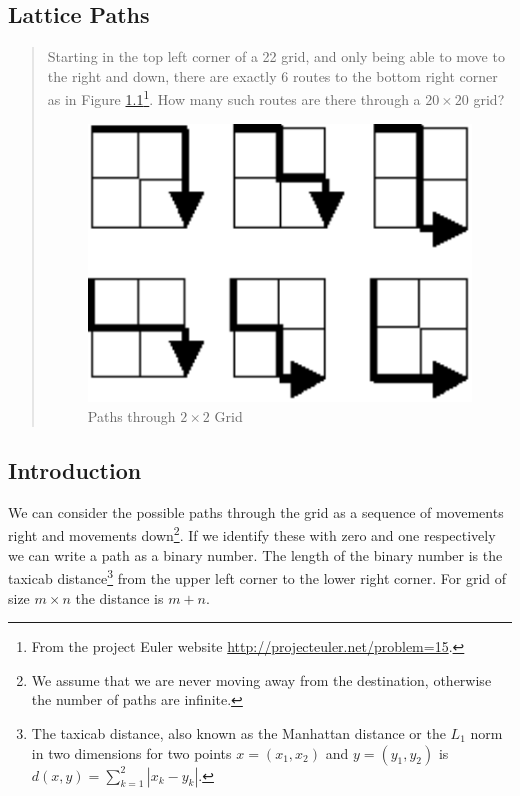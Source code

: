 \documentclass[oneside,12pt]{book}   	%
\newcounter{ex}
\newcounter{pr}
\theoremstyle{definition}
\newcommand{\order}[1]{\left| #1 \right|}
\begin{document}
\begin{spacing}{1.618}
	\chapter{Lattice Paths}
		\begin{quote}
			Starting in the top left corner of a 22 grid, and only being able to move to the right and down, there are exactly 6 routes to the bottom right corner as in Figure \ref{Fig:15:1}\footnote{From the project Euler website \url{http://projecteuler.net/problem=15}.}. How many such routes are there through a $20\times 20$ grid?
			\begin{figure}
				\centering
					\includegraphics[]{p_015.pdf}
				\caption{Paths through $2\times 2$ Grid}\label{Fig:15:1}
			\end{figure}
		\end{quote}
		\section{Introduction}
		
			We can consider the possible paths through the grid as a sequence of movements right and movements down\footnote{We assume that we are never moving away from the destination, otherwise the number of paths are infinite.}. If we identify these with zero and one respectively we can write a path as a binary number. The length of the binary number is the taxicab distance\footnote{The taxicab distance, also known as the Manhattan distance or the $L_1$ norm in two dimensions for two points $x=(x_1, x_2)$ and $y=(y_1, y_2)$ is $d(x, y)=\sum_{k=1}^2\order{x_k-y_k}$.} from the upper left corner to the lower right corner. For grid of size $m\times n$ the distance is $m+n$. 
			

\end{spacing}
\end{document}
